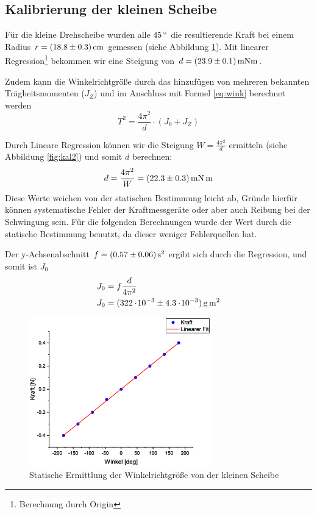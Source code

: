\subsection{Kalibrierung der kleinen Scheibe}
Für die kleine Drehscheibe wurden alle $\unit[45]{^\circ}$ die resultierende Kraft bei einem Radius $r = \unit[(18.8 \pm 0.3)]{cm}$ gemessen (siehe Abbildung \ref{fig:kal1}). Mit linearer Regression\footnote{Berechnung durch Origin} bekommen wir eine Steigung von $d = \unit[(23.9 \pm 0.1)]{mN m}$.

Zudem kann die Winkelrichtgröße durch das hinzufügen von mehreren bekannten Trägheitsmomenten ($J_Z$) und im Anschluss mit Formel \ref{eq:wink} berechnet werden
\begin{equation}
T^2 = \frac{4\pi^2}{d}\cdot (J_0+J_Z)
\end{equation}

Durch Lineare Regression können wir die Steigung $W = \frac{4\pi^2}{d}$ ermitteln (siehe Abbildung \ref{fig:kal2}) und somit $d$ berechnen:
\begin{equation*}
d = \frac{4\pi^2}{W} = \unit[(22.3 \pm 0.3)]{mN \, m}
\end{equation*}
Diese Werte weichen von der statischen Bestimmung leicht ab, Gründe hierfür können systematische Fehler der Kraftmessgeräte oder aber auch Reibung bei der Schwingung sein. Für die folgenden Berechnungen wurde der Wert durch die statische Bestimmung benutzt, da dieser weniger Fehlerquellen hat.

Der y-Achsenabschnitt $f = \unit[(0.57 \pm 0.06)]{s^2}$ ergibt sich durch die Regression, und somit ist $J_0$
\begin{align}
J_0 &= f\frac{d}{4\pi^2}\\
J_0 &= \unit[(322\e{-3} \pm 4.3\e{-3})]{g \, m^2}
\end{align}


\begin{figure}
\begin{center}
\includegraphics[width=0.7\textwidth]{Bilder/kal1.eps}
\caption{Statische Ermittlung der Winkelrichtgröße von der kleinen Scheibe}
\label{fig:kal1}
\end{center}
\end{figure}

